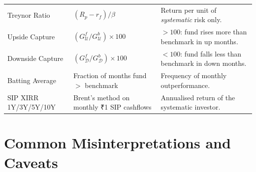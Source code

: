 \documentclass[12pt, a4paper]{article}
\begin{document}
\begin{longtable}{@{}p{3.8cm}p{5cm}p{5.2cm}@{}}
Treynor Ratio
  & $(R_p - r_f) / \beta$
  & Return per unit of \emph{systematic} risk only. \\[4pt]

Upside Capture
  & $(G_\mathcal{U}^f / G_\mathcal{U}^b) \times 100$
  & $>100$: fund rises more than benchmark in up months. \\[4pt]

Downside Capture
  & $(G_\mathcal{D}^f / G_\mathcal{D}^b) \times 100$
  & $<100$: fund falls less than benchmark in down months. \\[4pt]

Batting Average
  & Fraction of months fund $>$ benchmark
  & Frequency of monthly outperformance. \\[4pt]

SIP XIRR 1Y/3Y/5Y/10Y
  & Brent's method on monthly ₹1 SIP cashflows
  & Annualised return of the systematic investor. \\[4pt]

\end{longtable}

\section{Common Misinterpretations and Caveats}
\end{document}
